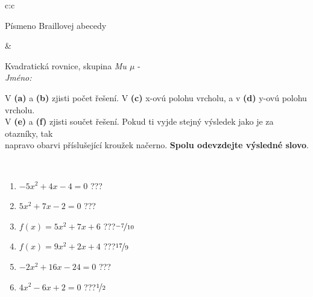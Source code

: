 \documentclass[10pt]{report}
\begin{document}
\begin{tabular}{c:c}
\begin{minipage}[c][104.5mm][t]{0.5\linewidth}
\begin{center}
\begin{minipage}{0.20\linewidth}
\begin{center}
{\small Písmeno Braillovej abecedy}
\end{center}
\end{minipage}
\end{center}
\end{minipage}
&
\begin{minipage}[c][104.5mm][t]{0.5\linewidth}
\begin{center}
\vspace{7mm}
{\huge Kvadratická rovnice, skupina \textit{Mu $\mu$} -}\\[5mm]
\textit{Jméno:}\phantom{xxxxxxxxxxxxxxxxxxxxxxxxxxxxxxxxxxxxxxxxxxxxxxxxxxxxxxxxxxxxxxxxx}\\[5mm]
\begin{minipage}{0.95\linewidth}
\begin{center}
V \textbf{(a)} a \textbf{(b)} zjisti počet řešení. V \textbf{(c)} x-ovú polohu vrcholu, a v \textbf{(d)} y-ovú polohu vrcholu.\\V \textbf{(e)} a \textbf{(f)} zjisti součet řešení. Pokud ti vyjde stejný výsledek jako je za otazníky, tak\\napravo obarvi příslušející kroužek načerno. \textbf{Spolu odevzdejte výsledné slovo}.
\end{center}
\end{minipage}
\\[1mm]
\begin{minipage}{0.79\linewidth}
\begin{center}
\begin{varwidth}{\linewidth}
\begin{enumerate}
\Large
\item $-5x^2+4x-4=0$\quad \dotfill\; ???\;\dotfill {}
\item $5x^2+7x-2=0$\quad \dotfill\; ???\;\dotfill {}
\item $f(x)=5x^2+7x+6$\quad \dotfill\; ???\;\dotfill \quad $\nicefrac{-7}{10}$
\item $f(x)=9x^2+2x+4$\quad \dotfill\; ???\;\dotfill \quad $\nicefrac{17}{9}$
\item $-2x^2+16x-24=0$\quad \dotfill\; ???\;\dotfill {}
\item $4x^2-6x+2=0$\quad \dotfill\; ???\;\dotfill \quad $\nicefrac{1}{2}$
\end{enumerate}
\end{varwidth}
\end{center}
\end{minipage}
\begin{minipage}{0.20\linewidth}
\begin{center}

\end{center}
\end{minipage}
\end{center}
\end{minipage}
\end{tabular}
\end{document}
